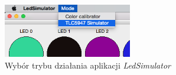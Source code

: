 \documentclass[eng,printmode]{mgr}
\begin{document}
\begin{figure}[!ht]
    \centering
    \includegraphics[width=0.5\textwidth]{Figures/modes.png} 
    \caption{Wybór trybu działania aplikacji \emph{LedSimulator}}
    \label{fig:modes}
\end{figure}


\listoffigures

\newpage
\renewcommand{\thechapter}{}
\renewcommand{\chaptername}{}
\end{document}

